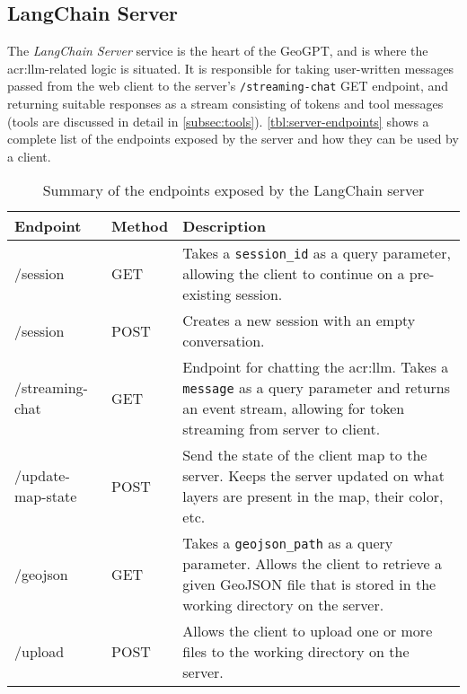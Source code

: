 \subsection{LangChain Server}\label{subsec:langchain-server}
\label{subsec:langchain-server-architecture}

The \textit{LangChain Server} service is the heart of the GeoGPT, and is where the \gls{acr:llm}-related logic is situated. It is responsible for taking user-written messages passed from the web client to the server's \texttt{/streaming-chat} GET endpoint, and returning suitable responses as a stream consisting of tokens and tool messages (tools are discussed in detail in \autoref{subsec:tools}). \autoref{tbl:server-endpoints} shows a complete list of the endpoints exposed by the server and how they can be used by a client.

\begin{table}[H]
    \centering
    \caption[API endpoints exposed by GeoGPT's LangChain server]{Summary of the endpoints exposed by the LangChain server}
    \label{tbl:server-endpoints}
    \begin{tabular}{p{}p{}p{}}
        \toprule
        \textbf{Endpoint} & \textbf{Method} & \textbf{Description}                                                                                                                                                         \\
        \midrule
        /session          & GET             & Takes a \texttt{session\_id} as a query parameter, allowing the client to continue on a pre-existing session.                                                                \\
        /session          & POST            & Creates a new session with an empty conversation.                                                                                                                            \\
        /streaming-chat   & GET             & Endpoint for chatting the \acrshort{acr:llm}. Takes a \texttt{message} as a query parameter and returns an event stream, allowing for token streaming from server to client. \\
        /update-map-state & POST            & Send the state of the client map to the server. Keeps the server updated on what layers are present in the map, their color, etc.                                            \\
        /geojson          & GET             & Takes a \texttt{geojson\_path} as a query parameter. Allows the client to retrieve a given GeoJSON file that is stored in the working directory on the server.               \\
        /upload           & POST            & Allows the client to upload one or more files to the working directory on the server.                                                                                        \\
        \bottomrule
    \end{tabular}
\end{table}

